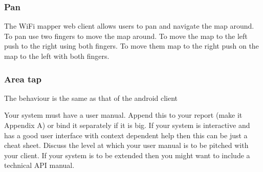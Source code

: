 \subsubsection{Pan}
The WiFi mapper web client allows users to pan and navigate the map around. To pan use two fingers to move the map around. To move the map to the left push to the right using both fingers. To move them map to the right push on the map to the left with both fingers.

\subsubsection{Area tap}
The behaviour is the same as that of the android client



Your system must have a user manual. Append this to your report (make
it Appendix A) or bind it separately if it is big. If your system is
interactive and has a good user interface with context dependent help
then this can be just a cheat sheet. Discuss the level at which your
user manual is to be pitched with your client. If your system is to be
extended then you might want to include a technical API manual.

